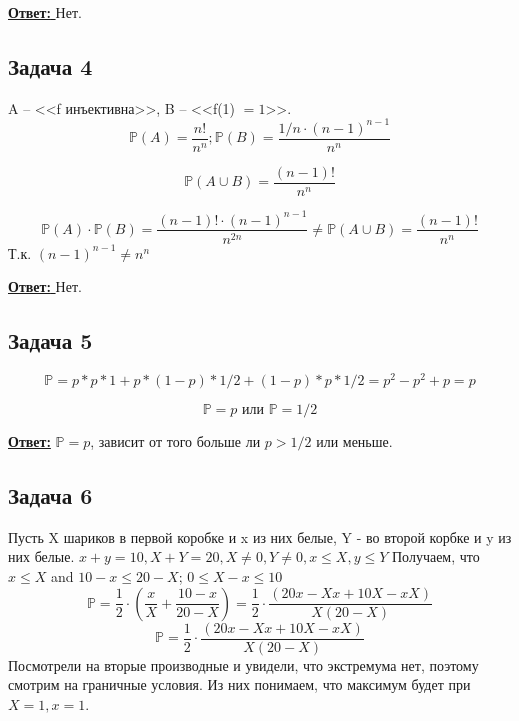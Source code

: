 \documentclass[a4paper,14pt]{article} %
\begin{document}
\underline{\textbf{Ответ: }} Нет.

\subsection{Задача 4}
A -- <<f инъективна>>, B -- <<f(1) $= 1$>>.
\begin{equation*}
	\mathds{P}(A) = \frac{n!}{n^n}; \mathds{P}(B) = \frac{1/n \cdot (n-1)^{n-1}}{n^n}	
\end{equation*}

\begin{equation*}
	\mathds{P}(A \cup B) = \frac{(n-1)!}{n^n}
\end{equation*}

\begin{equation*}
	\mathds{P}(A) \cdot \mathds{P}(B) = \frac{(n-1)! \cdot (n-1)^{n-1}}{n^{2n}} \not = \mathds{P}(A \cup B) = \frac{(n-1)!}{n^n}
\end{equation*}
Т.к. $(n-1)^{n-1} \not = n^n$

\underline{\textbf{Ответ: }} Нет.

\subsection{Задача 5}
\begin{equation*}
	\mathds{P} = p * p * 1 + p * (1-p) * 1/2 + (1-p) * p * 1/2 = p^2 - p^2 + p = p
\end{equation*}

\begin{equation*}
	\mathds{P} = p \text{  или  } \mathds{P} = 1/2
\end{equation*}

\underline{\textbf{Ответ:}} $\mathds{P} = p$, зависит от того больше ли $p > 1/2$ или меньше.

\subsection{Задача 6}
Пусть X шариков в первой коробке и x из них белые, Y - во второй корбке и y из них белые. $x + y = 10, X + Y = 20, X \not = 0, Y \not = 0, x \leq X, y \leq Y$
\newline
Получаем, что $x \leq X$ and $10 - x \leq 20 - X$; $0 \leq X - x \leq 10$
\begin{equation*}
	\mathds{P} = \frac{1}{2} \cdot (\frac{x}{X} + \frac{10-x}{20-X}) = \frac{1}{2} \cdot \frac{(20x - Xx + 10X - xX)}{X (20 - X)}
\end{equation*}
\begin{equation*}
	\mathds{P} = \frac{1}{2} \cdot \frac{(20x - Xx + 10X - xX)}{X (20 - X)} 
\end{equation*}
Посмотрели на вторые производные и увидели, что экстремума нет, поэтому смотрим на граничные условия.
Из них понимаем, что максимум будет при $X = 1, x = 1$.
\end{document}

